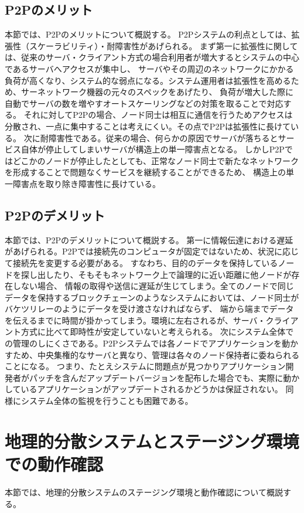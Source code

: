 \subsection{P2Pのメリット}
本節では、P2Pのメリットについて概説する。
P2Pシステムの利点としては、拡張性（スケーラビリティ）・耐障害性があげられる。
まず第一に拡張性に関しては、従来のサーバ・クライアント方式の場合利用者が増大するとシステムの中心であるサーバへアクセスが集中し、
サーバやその周辺のネットワークにかかる負荷が高くなり、システム的な弱点になる。システム運用者は拡張性を高めるため、サーネットワーク機器の元々のスペックをあげたり、
負荷が増大した際に自動でサーバの数を増やすオートスケーリングなどの対策を取ることで対応する。
それに対してP2Pの場合、ノード同士は相互に通信を行うためアクセスは分散され、一点に集中することは考えにくい。その点でP2Pは拡張性に長けている。
次に耐障害性である。従来の場合、何らかの原因でサーバが落ちるとサービス自体が停止してしまいサーバが構造上の単一障害点となる。
しかしP2Pではどこかのノードが停止したとしても、正常なノード同士で新たなネットワークを形成することで問題なくサービスを継続することができるため、
構造上の単一障害点を取り除き障害性に長けている。

\subsection{P2Pのデメリット}
本節では、P2Pのデメリットについて概説する。
第一に情報伝達における遅延があげられる。P2Pでは接続先のコンピュータが固定ではないため、状況に応じて接続先を変更する必要がある。
すなわち、目的のデータを保持しているノードを探し出したり、そもそもネットワーク上で論理的に近い距離に他ノードが存在しない場合、
情報の取得や送信に遅延が生じてしまう。全てのノードで同じデータを保持するブロックチェーンのようなシステムにおいては、ノード同士がバケツリレーのようにデータを受け渡さなければならず、
端から端までデータを伝えるまでに時間が掛かってしまう。環境に左右されるが、サーバ・クライアント方式に比べて即時性が安定していないと考えられる。
次にシステム全体での管理のしにくさである。P2Pシステムでは各ノードでアプリケーションを動かすため、中央集権的なサーバと異なり、管理は各々のノード保持者に委ねられることになる。
つまり、たとえシステムに問題点が見つかりアプリケーション開発者がパッチを含んだアップデートバージョンを配布した場合でも、実際に動かしているアプリケーションがアップデートされるかどうかは保証されない。
同様にシステム全体の監視を行うことも困難である。

\section{地理的分散システムとステージング環境での動作確認}
本節では、地理的分散システムのステージング環境と動作確認について概説する。

